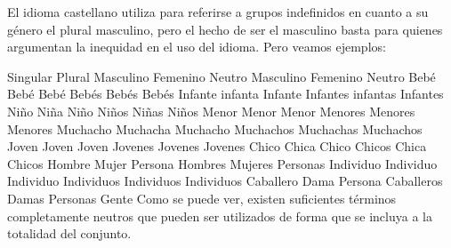 El idioma castellano utiliza para referirse a grupos indefinidos en cuanto a su género el plural masculino, pero el hecho de ser el masculino basta para quienes argumentan la inequidad en el uso del idioma. Pero veamos ejemplos:

Singular	Plural
Masculino	Femenino	Neutro	Masculino	Femenino	Neutro
Bebé	Bebé	Bebé	Bebés	Bebés	Bebés
Infante	infanta	Infante	Infantes	infantas	Infantes
Niño	Niña	Niño	Niños	Niñas	Niños
Menor	Menor	Menor	Menores	Menores	Menores
Muchacho	Muchacha	Muchacho	Muchachos	Muchachas	Muchachos
Joven	Joven	Joven	Jovenes	Jovenes	Jovenes
Chico	Chica	Chico	Chicos	Chica	Chicos
Hombre	Mujer	Persona	Hombres	Mujeres	Personas
Individuo	Individuo	Individuo	Individuos	Individuos	Individuos
Caballero	Dama	Persona	Caballeros	Damas	Personas
 	Gente
Como se puede ver, existen suficientes términos completamente neutros que pueden ser utilizados de forma que se incluya a la totalidad del conjunto.

